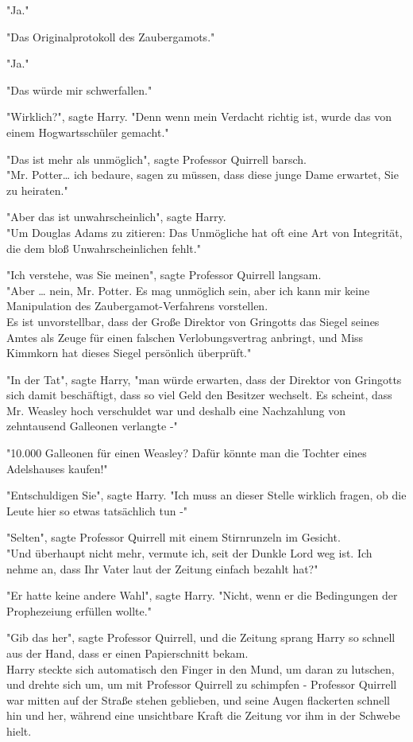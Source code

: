 {"Ja."

"Das Originalprotokoll des Zaubergamots."

"Ja."

"Das würde mir schwerfallen."

"Wirklich?", sagte Harry. "Denn wenn mein Verdacht richtig ist, wurde das von einem Hogwartsschüler gemacht."

"Das ist mehr als unmöglich", sagte Professor Quirrell barsch.\\ "Mr. Potter… ich bedaure, sagen zu müssen, dass diese junge Dame erwartet, Sie zu heiraten."

"Aber das ist unwahrscheinlich", sagte Harry.\\ "Um Douglas Adams zu zitieren: Das Unmögliche hat oft eine Art von Integrität, die dem bloß Unwahrscheinlichen fehlt."

"Ich verstehe, was Sie meinen", sagte Professor Quirrell langsam.\\ "Aber … nein, Mr. Potter. Es mag unmöglich sein, aber ich kann mir keine Manipulation des Zaubergamot-Verfahrens vorstellen.\\ Es ist unvorstellbar, dass der Große Direktor von Gringotts das Siegel seines Amtes als Zeuge für einen falschen Verlobungsvertrag anbringt, und Miss Kimmkorn hat dieses Siegel persönlich überprüft."

"In der Tat", sagte Harry, "man würde erwarten, dass der Direktor von Gringotts sich damit beschäftigt, dass so viel Geld den Besitzer wechselt. Es scheint, dass Mr. Weasley hoch verschuldet war und deshalb eine Nachzahlung von zehntausend Galleonen verlangte -"

"10.000 Galleonen für einen Weasley? Dafür könnte man die Tochter eines Adelshauses kaufen!"

"Entschuldigen Sie", sagte Harry. "Ich muss an dieser Stelle wirklich fragen, ob die Leute hier so etwas tatsächlich tun -"

"Selten", sagte Professor Quirrell mit einem Stirnrunzeln im Gesicht.\\ "Und überhaupt nicht mehr, vermute ich, seit der Dunkle Lord weg ist. Ich nehme an, dass Ihr Vater laut der Zeitung einfach bezahlt hat?"

"Er hatte keine andere Wahl", sagte Harry. "Nicht, wenn er die Bedingungen der Prophezeiung erfüllen wollte."

"Gib das her", sagte Professor Quirrell, und die Zeitung sprang Harry so schnell aus der Hand, dass er einen Papierschnitt bekam.\\ Harry steckte sich automatisch den Finger in den Mund, um daran zu lutschen, und drehte sich um, um mit Professor Quirrell zu schimpfen - Professor Quirrell war mitten auf der Straße stehen geblieben, und seine Augen flackerten schnell hin und her, während eine unsichtbare Kraft die Zeitung vor ihm in der Schwebe hielt.

}
